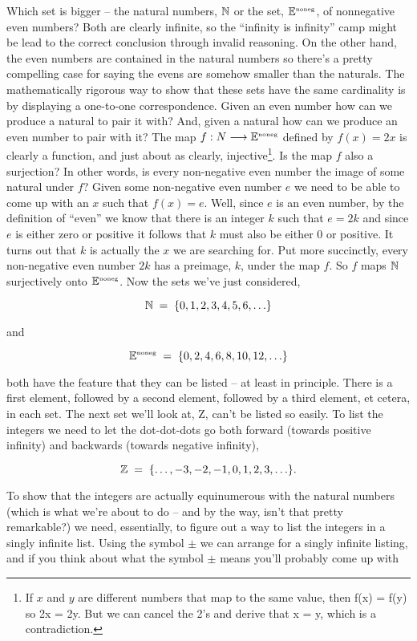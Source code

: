 Which set is bigger -- the natural numbers, ${\mathbb N}$ or the set, 
${\mathbb E}^{\mbox{\tiny noneg}}$, of nonnegative even numbers?
Both are clearly infinite, so the ``infinity is infinity'' camp might be lead
to the correct conclusion through invalid reasoning.  On the other hand,
the even numbers are contained in the natural numbers so there's a pretty
compelling case for saying the evens are somehow smaller than the naturals.  
The mathematically rigorous way to show that these sets have the same
cardinality is by displaying a one-to-one correspondence.  Given an even
number how can we produce a natural to pair it with?  And, given a natural
how can we produce an even number to pair with it?
The map $f : N \longrightarrow {\mathbb E}^{\mbox{\tiny noneg}}$ defined by $f(x) = 2x$ 
is clearly a function,
and just about as clearly, injective\footnote{If $x$ and $y$ are 
different numbers that map to the same value, then f(x) = f(y) so
2x = 2y. But we can cancel the 2's and derive that x = y, which is a contradiction.}.  Is the map $f$ also a surjection? In other
words, is every non-negative even number the image of some natural under
$f$?  Given some non-negative even number $e$ we need to be able to come
up with an $x$ such that $f(x) = e$.   Well, since $e$ is an even number, by the
definition of ``even'' we know that there is an integer $k$ such that $e = 2k$ 
and since $e$ is either zero or positive it follows that $k$ must also be 
either $0$ or positive. It turns out that $k$ is actually the $x$ we 
are searching for. Put more
succinctly, every non-negative even number $2k$ has a preimage, $k$, under the
map $f$.  So $f$ maps ${\mathbb N}$ surjectively onto ${\mathbb E}^{\mbox{\tiny noneg}}$.
Now the sets we've just considered, 

\[ {\mathbb N} \; = \; \{0, 1, 2, 3, 4, 5, 6, \ldots \} \]

\noindent and

\[ {\mathbb E}^{\mbox{\tiny noneg}} \; = \; \{0, 2, 4, 6, 8, 10, 12, \ldots \} \]

\noindent both have the feature that they can be listed -- at 
least in principle. There is a first element, followed by a 
second element, followed by a third element,
et cetera, in each set. The next set we'll look at, Z, can't be listed so easily.
To list the integers we need to let the dot-dot-dots go both forward (towards
positive infinity) and backwards (towards negative infinity),

\[ {\mathbb Z} \; = \; \{ \ldots , -3, -2, -1, 0, 1, 2, 3, \ldots \}. \]

\noindent To show that the integers are actually equinumerous with the natural
numbers (which is what we're about to do -- and by the way, isn't that pretty
remarkable?) we need, essentially, to figure out a way to list the integers in
a singly infinite list. Using the symbol $\pm$ we can arrange for a singly infinite
listing, and if you think about what the symbol $\pm$ means you'll probably
come up with

